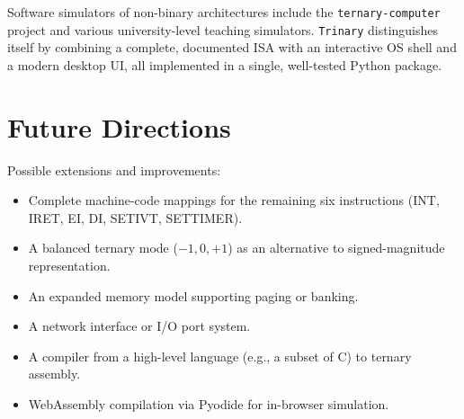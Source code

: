 \documentclass[11pt,a4paper]{article}
\newcommand{\trinary}{\texttt{Trinary}}
\begin{document}
Software simulators of non-binary architectures include the
\texttt{ternary-computer} project and various
university-level teaching simulators.  \trinary{} distinguishes itself by
combining a complete, documented ISA with an interactive OS shell and a
modern desktop UI, all implemented in a single, well-tested Python
package.

\section{Future Directions}
\label{sec:future}

Possible extensions and improvements:

\begin{itemize}
  \item Complete machine-code mappings for the remaining six instructions
        (INT, IRET, EI, DI, SETIVT, SETTIMER).
  \item A balanced ternary mode ($-1, 0, +1$) as an alternative to
        signed-magnitude representation.
  \item An expanded memory model supporting paging or banking.
  \item A network interface or I/O port system.
  \item A compiler from a high-level language (e.g., a subset of C) to
        ternary assembly.
  \item WebAssembly compilation via Pyodide for in-browser simulation.
\end{itemize}

\printbibliography
\end{document}
